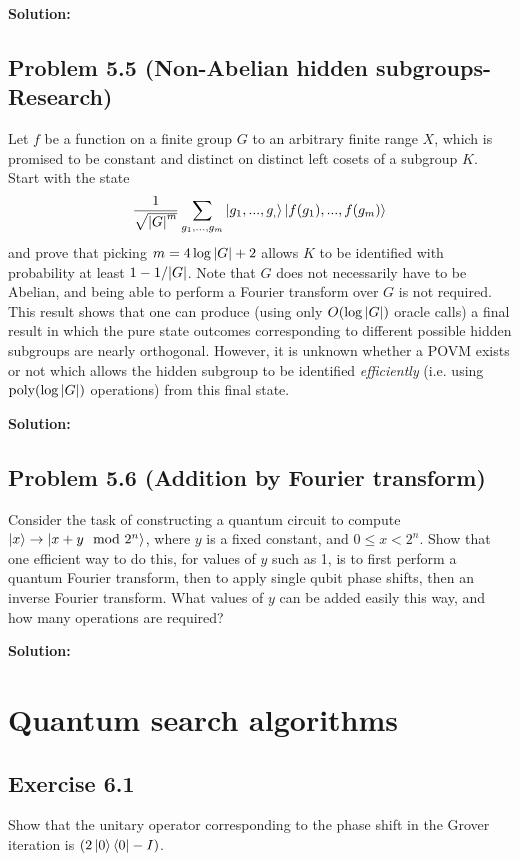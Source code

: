 \documentclass{book}
\begin{document}
    \textbf{Solution:}

\section*{Problem 5.5 (Non-Abelian hidden subgroups- Research)}
    Let $f$ be a function on a finite group $G$ to an arbitrary finite range $X$, which is promised to be constant and distinct on distinct left cosets of a subgroup $K$. Start with the state
    \begin{align}
        \frac{1}{\sqrt{\abs{G}^m}} \sum_{g_1,...,g_m}\ket{g_1,...,g_,}\ket{f(g_1),...,f(g_m)}
    \end{align}
    and prove that picking $m=4\log\abs{G}+2$ allows $K$ to be identified with probability at least $1-1/\abs{G}$. Note that $G$ does not necessarily have to be Abelian, and being able to perform a Fourier transform over $G$ is not required. This result shows that one can produce (using only $O(\log\abs{G})$ oracle calls) a final result in which the pure state outcomes corresponding to different possible hidden subgroups are nearly orthogonal. However, it is unknown whether a POVM exists or not which allows the hidden subgroup to be identified \emph{efficiently} (i.e. using $\text{poly}(\log\abs{G})$ operations) from this final state.
    
    \textbf{Solution:}

\section*{Problem 5.6 (Addition by Fourier transform)}
    Consider the task of constructing a quantum circuit to compute $\ket{x}\rightarrow \ket{x +y \mod 2^n}$, where $y$ is a fixed constant, and $0\leq x < 2^n$. Show that one efficient way to do this, for values of $y$ such as 1, is to first perform a quantum Fourier transform, then to apply single qubit phase shifts, then an inverse Fourier transform. What values of $y$ can be added easily this way, and how many operations are required?
    
    \textbf{Solution:}

\chapter{Quantum search algorithms}

\section*{Exercise 6.1} 
    Show that the unitary operator corresponding to the phase shift in the Grover iteration is $(2\ket{0}\bra{0}-I)$.
    
\end{document}
